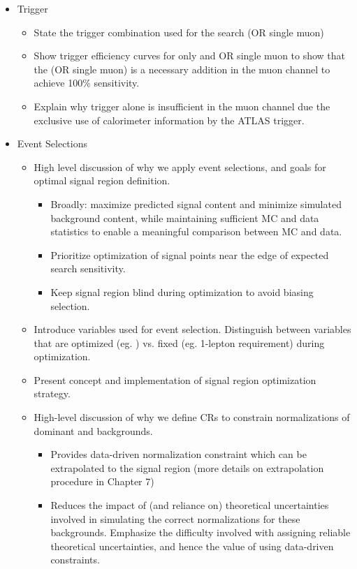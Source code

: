 \begin{description}
\begin{itemize}
\item Trigger
\begin{itemize}
\item State the trigger combination used for the search (\met OR single muon)
\item Show trigger efficiency curves for \met only and \met OR single muon to show that the (OR single muon) is a necessary addition in the muon channel to achieve 100\% sensitivity.
\item Explain why \met trigger alone is insufficient in the muon channel due the exclusive use of calorimeter information by the ATLAS \met trigger.
\end{itemize}

\item Event Selections
\begin{itemize}
\item High level discussion of why we apply event selections, and goals for optimal signal region definition.
\begin{itemize}
\item Broadly: maximize predicted signal content and minimize simulated background content, while maintaining sufficient MC and data statistics to enable a meaningful comparison between MC and data.
\item Prioritize optimization of signal points near the edge of expected search sensitivity. 
\item Keep signal region blind during optimization to avoid biasing selection.
\end{itemize}
\item Introduce variables used for event selection. Distinguish between variables that are optimized (eg. \mtlepmet) vs. fixed (eg. 1-lepton requirement) during optimization.
\item Present concept and implementation of signal region optimization strategy.
\item High-level discussion of why we define CRs to constrain normalizations of dominant \wjets and \ttbar backgrounds.
\begin{itemize}
\item Provides data-driven normalization constraint which can be extrapolated to the signal region (more details on extrapolation procedure in Chapter 7)
\item Reduces the impact of (and reliance on) theoretical uncertainties involved in simulating the correct normalizations for these backgrounds. Emphasize the difficulty involved with assigning reliable theoretical uncertainties, and hence the value of using data-driven constraints.

\end{itemize}
\end{itemize}
\end{itemize}
\end{description}
